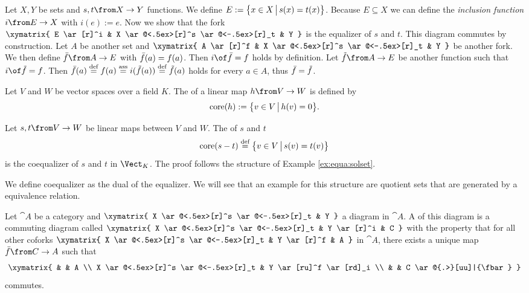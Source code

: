 \begin{example}
  \label{ex:equa:solset}
  Let $X, Y$ be sets and $s, t \from X \to Y$ functions.
  We define $E := \bigl \{ x \in X \,\big|\, s(x)=t(x) \bigr \}$.
  Because $E \subseteq X$ we can define the \emph{inclusion function} $i \from E \to X$ with $i(e) := e$.
  Now we show that the fork
  $ \xymatrix{
    E \ar[r]^i & X \ar@<.5ex>[r]^s \ar@<-.5ex>[r]_t & Y
  } $
  is the equalizer of $s$ and $t$. This diagram commutes by construction.
  Let $A$ be another set and
  $ \xymatrix{
    A \ar[r]^f & X \ar@<.5ex>[r]^s \ar@<-.5ex>[r]_t & Y
  } $
  be another fork.
  We then define $\fbar \from A \to E$ with $\bar{f}(a) = f(a)$.
  Then $i \of \fbar = f$ holds by definition.
  Let $\ftilde \from A \to E$ be another function such that $i \of \ftilde = f$.
  Then $\bar{f}(a) \stackrel{\text{def}}{=} f(a) \stackrel{\text{ass}}{=} i(\tilde{f}(a)) \stackrel{\text{def}}{=} \tilde{f}(a)$ holds for every $a \in A$, thus $\bar{f} = \tilde{f}$.
\end{example}

\begin{example}
  \label{ex:equa:core}
  Let $V$ and $W$ be vector spaces over a field $K$.
  The  of a linear map $h \from V \to W$ is defined by $$\operatorname{core}(h) := \bigl \{ v \in V \,\big|\, h(v) = 0 \bigr \}.$$

  Let $s, t \from V \to W$ be linear maps between $V$ and $W$.
  The  of $s$ and $t$ $$\operatorname{core}(s - t) \stackrel{\text{def}}{=} \bigl \{ v \in V \,\big|\, s(v) = t(v) \bigr \}$$ is the coequalizer of $s$ and $t$ in $\Vect_K$.
  The proof follows the structure of Example \ref{ex:equa:solset}.
\end{example}

We define coequalizer as the dual of the equalizer. We will see that an example for this structure are quotient sets that are generated by a equivalence relation. 

\begin{definition}[Coequalizer]
  \label{def:coequa}
  Let $\cat{A}$ be a category and
  $ \xymatrix{
    X \ar@<.5ex>[r]^s \ar@<-.5ex>[r]_t & Y
  } $
  a diagram in $\cat{A}$.
  A  of this diagram is a commuting diagram called 
  $ \xymatrix{
    X \ar@<.5ex>[r]^s \ar@<-.5ex>[r]_t & Y \ar[r]^i & C
  } $
  with the property that for all other coforks
  $ \xymatrix{
    X \ar@<.5ex>[r]^s \ar@<-.5ex>[r]_t & Y \ar[r]^f & A
  } $
  in $\cat{A}$, there exists a unique map $\fbar\from C \to A$ such that
  \[ \xymatrix{
    & & A  \\
    X \ar@<.5ex>[r]^s \ar@<-.5ex>[r]_t & Y \ar[ru]^f \ar[rd]_i \\
    & & C \ar@{.>}[uu]|{\fbar}
  } \]
  commutes.
\end{definition}

